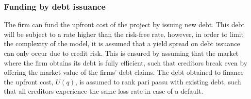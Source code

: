 \documentclass[../main.tex]{subfiles}
\begin{document}
    \subsubsection{Funding by debt issuance}
        The firm can fund the upfront cost of the project by issuing new debt.
        This debt will be subject to a rate higher than the risk-free rate, 
        however, in order to limit the complexity of the model, 
        it is assumed that a yield spread on debt issuance can only occur due to credit risk. 
        This is ensured by assuming that the market where the firm obtains its debt is fully efficient, 
        such that creditors break even by offering the market value of the firms' debt claims.
        The debt obtained to finance the upfront cost, $U(q)$, is assumed to rank pari passu with existing debt, 
        such that all creditors experience the same loss rate in case of a default.
\end{document}
